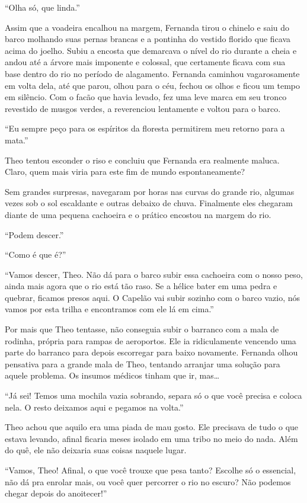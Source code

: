 ``Olha só, que linda.''

Assim que a voadeira encalhou na margem, Fernanda tirou o chinelo e saiu
do barco molhando suas pernas brancas e a pontinha do vestido florido
que ficava acima do joelho. Subiu a encosta que demarcava o nível do rio
durante a cheia e andou até a árvore mais imponente e colossal, que
certamente ficava com sua base dentro do rio no período de alagamento.
Fernanda caminhou vagarosamente em volta dela, até que parou, olhou para
o céu, fechou os olhos e ficou um tempo em silêncio. Com o facão que
havia levado, fez uma leve marca em seu tronco revestido de musgos
verdes, a reverenciou lentamente e voltou para o barco.

``Eu sempre peço para os espíritos da floresta permitirem meu retorno
para a mata.''

Theo tentou esconder o riso e concluiu que Fernanda era realmente
maluca. Claro, quem mais viria para este fim de mundo espontaneamente?

Sem grandes surpresas, navegaram por horas nas curvas do grande rio,
algumas vezes sob o sol escaldante e outras debaixo de chuva. Finalmente
eles chegaram diante de uma pequena cachoeira e o prático encostou na
margem do rio.

``Podem descer.''

``Como é que é?''

``Vamos descer, Theo. Não dá para o barco subir essa cachoeira com o
nosso peso, ainda mais agora que o rio está tão raso. Se a hélice bater
em uma pedra e quebrar, ficamos presos aqui. O Capelão vai subir sozinho
com o barco vazio, nós vamos por esta trilha e encontramos com ele lá em
cima.''

Por mais que Theo tentasse, não conseguia subir o barranco com a mala de
rodinha, própria para rampas de aeroportos. Ele ia ridiculamente
vencendo uma parte do barranco para depois escorregar para baixo
novamente. Fernanda olhou pensativa para a grande mala de Theo, tentando
arranjar uma solução para aquele problema. Os insumos médicos tinham que
ir, mas\ldots{}

``Já sei! Temos uma mochila vazia sobrando, separa só o que você precisa
e coloca nela. O resto deixamos aqui e pegamos na volta.''

Theo achou que aquilo era uma piada de mau gosto. Ele precisava de tudo
o que estava levando, afinal ficaria meses isolado em uma tribo no meio
do nada. Além do quê, ele não deixaria suas coisas naquele lugar.

``Vamos, Theo! Afinal, o que você trouxe que pesa tanto? Escolhe só o
essencial, não dá pra enrolar mais, ou você quer percorrer o rio no
escuro? Não podemos chegar depois do anoitecer!''

